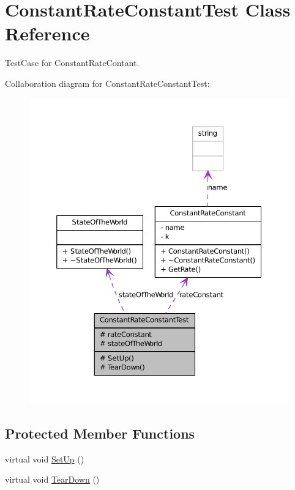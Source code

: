\hypertarget{classConstantRateConstantTest}{
\section{ConstantRateConstantTest Class Reference}
\label{classConstantRateConstantTest}
}


TestCase for ConstantRateContant.  




Collaboration diagram for ConstantRateConstantTest:
\nopagebreak
\begin{figure}[H]
\begin{center}
\leavevmode
\includegraphics[width=372pt]{classConstantRateConstantTest__coll__graph}
\end{center}
\end{figure}
\subsection*{Protected Member Functions}
\begin{DoxyCompactItemize}
\item 
virtual void \hyperlink{classConstantRateConstantTest_afafa5788d27fda84c1a11c283e44407e}{SetUp} ()
\item 
virtual void \hyperlink{classConstantRateConstantTest_a7a77df51f310b128a6a9540a380be390}{TearDown} ()
\end{DoxyCompactItemize}
